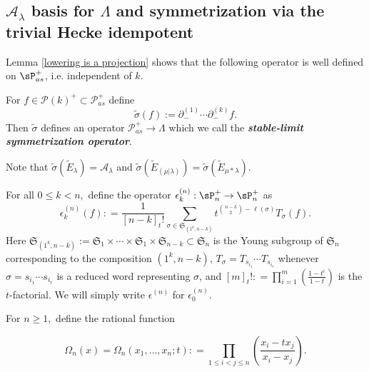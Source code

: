 \subsection{\texorpdfstring{$\mathcal{A}_{\lambda}$}{A\_lambda} basis for \texorpdfstring{$\Lambda$}{Lambda} and symmetrization via the trivial Hecke idempotent}\label{symmetrization subsection}

Lemma \ref{lowering is a projection} shows that the following operator is well defined on $\sP_{as}^{+}$, i.e. independent of $k$.
\begin{defi} \label{defn8}

For $f\in \mathscr{P}(k)^{+} \subset \mathscr{P}_{as}^{+}$  define 
\begin{equation}\label{stable limit symmetrization}
    \widetilde{\sigma}(f) := \partial_{-}^{(1)}\cdots \partial_{-}^{(k)} f .
\end{equation} Then $\widetilde{\sigma}$ defines an operator $\mathscr{P}_{as}^{+} \rightarrow \Lambda$ which we call the \textbf{\textit{stable-limit symmetrization operator}}. 
\end{defi}

\begin{rema}
    Note that $\widetilde{\sigma}( \widetilde{E}_{ \lambda}) = \mathcal{A}_{\lambda}$ and $\widetilde{\sigma}(\widetilde{E}_{(\mu|\lambda)}) = \widetilde{\sigma}(\widetilde{E}_{\mu*\lambda}).$ 
\end{rema}


\begin{defi}\label{idempotents}
For all $0 \leq k < n,$ define the operator $\epsilon^{(n)}_k: \sP_n^{+} \rightarrow \sP_n^{+}$ as 
\begin{equation}\label{idempotent eq version 1}
\epsilon^{(n)}_k(f) : = \frac{1}{[n-k]_{t}!} \sum_{\sigma \in \mathfrak{S}_{(1^k,n-k)}} t^{\binom{n-k}{2} - \ell(\sigma)} T_{\sigma}(f).
\end{equation}
Here $\mathfrak{S}_{(1^k,n-k)} := \mathfrak{S}_1\times \cdots \times \mathfrak{S}_1 \times \mathfrak{S}_{n-k} \subset \mathfrak{S}_{n}$ is the Young subgroup of $\mathfrak{S}_{n}$ corresponding to the composition $(1^k,n-k)$, $T_{\sigma} = T_{s_{i_1}}\cdots T_{s_{i_r}}$ whenever $\sigma = s_{i_1}\cdots s_{i_r}$ is a reduced word representing $\sigma$, and $[m]_{t}! : = \prod_{i=1}^{m}(\frac{1-t^i}{1-t})$ is the $t$-factorial. We will simply write $\epsilon^{(n)}$ for $\epsilon^{(n)}_0$.

For $n \geq 1,$ define the rational function 

\begin{equation}\label{HL kernel}
    \Omega_n(x) = \Omega_n(x_1,\ldots,x_n;t): = \prod_{1\leq i<j\leq n}\left(\frac{x_i - tx_j}{x_i - x_j}\right).
\end{equation}

\end{defi}

